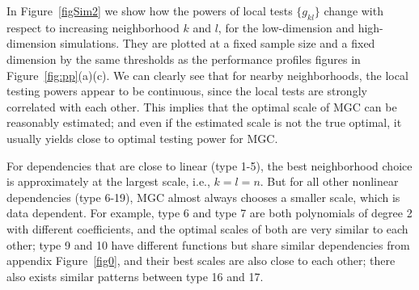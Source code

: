 \documentclass[11pt]{article}
\begin{document}
In Figure~\ref{figSim2} we show how the powers of local tests $\{g_{kl}\}$ change with respect to increasing neighborhood $k$ and $l$, for the low-dimension and high-dimension simulations. They are plotted at a fixed sample size and a fixed dimension by the same thresholds as the performance profiles figures in Figure~\ref{fig:pp}(a)(c). We can clearly see that for nearby neighborhoods, the local testing powers appear to be continuous, since the local tests are strongly correlated with each other. This implies that the optimal scale of MGC can be reasonably estimated; and even if the estimated scale is not the true optimal, it usually yields close to optimal testing power for MGC.

For dependencies that are close to linear (type 1-5), the best neighborhood choice is approximately at the largest scale, i.e., $k=l=n$. But for all other nonlinear dependencies (type 6-19), MGC almost always chooses a smaller scale, which is data dependent. For example, type 6 and type 7 are both polynomials of degree 2 with different coefficients, and the optimal scales of both are very similar to each other; type 9 and 10 have different functions but share similar dependencies from appendix Figure~\ref{fig0}, and their best scales are also close to each other; there also exists similar patterns between type 16 and 17.
\end{document}
